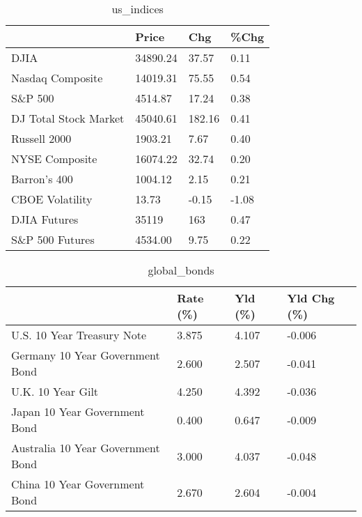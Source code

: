 \documentclass{article}%
\begin{document}
%


\begin{table}[htbp]%
\caption{us\_indices}%
\centering%
\begin{adjustbox}{width=1\textwidth}%
\begin{tabular}{llll}
\toprule
                      &    Price &    Chg &  \%Chg \\
\midrule
                 DJIA & 34890.24 &  37.57 &  0.11 \\
     Nasdaq Composite & 14019.31 &  75.55 &  0.54 \\
              S\&P 500 &  4514.87 &  17.24 &  0.38 \\
DJ Total Stock Market & 45040.61 & 182.16 &  0.41 \\
         Russell 2000 &  1903.21 &   7.67 &  0.40 \\
       NYSE Composite & 16074.22 &  32.74 &  0.20 \\
         Barron's 400 &  1004.12 &   2.15 &  0.21 \\
      CBOE Volatility &    13.73 &  -0.15 & -1.08 \\
         DJIA Futures &    35119 &    163 &  0.47 \\
      S\&P 500 Futures &  4534.00 &   9.75 &  0.22 \\
\bottomrule
\end{tabular}
%
\end{adjustbox}%
\end{table}

%


\begin{table}[htbp]%
\caption{global\_bonds}%
\centering%
\begin{adjustbox}{width=1\textwidth}%
\begin{tabular}{llll}
\toprule
                                  & Rate (\%) & Yld (\%) & Yld Chg (\%) \\
\midrule
       U.S. 10 Year Treasury Note &    3.875 &   4.107 &      -0.006 \\
  Germany 10 Year Government Bond &    2.600 &   2.507 &      -0.041 \\
                U.K. 10 Year Gilt &    4.250 &   4.392 &      -0.036 \\
    Japan 10 Year Government Bond &    0.400 &   0.647 &      -0.009 \\
Australia 10 Year Government Bond &    3.000 &   4.037 &      -0.048 \\
    China 10 Year Government Bond &    2.670 &   2.604 &      -0.004 \\
\bottomrule
\end{tabular}
%
\end{adjustbox}%
\end{table}
\end{document}
